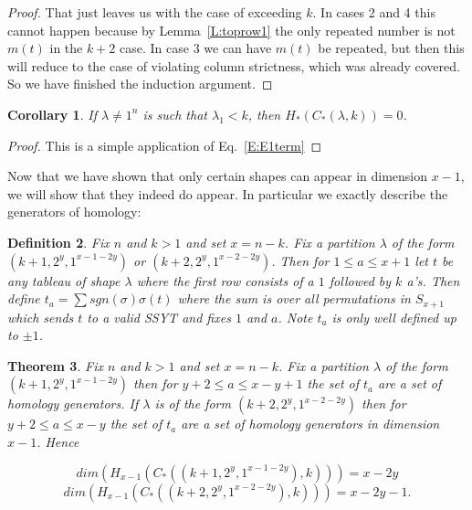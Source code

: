 \documentclass{amsart}
\newtheorem{theorem}{Theorem}[section]
\newtheorem{definition}[theorem]{Definition}
\newtheorem{corollary}[theorem]{Corollary}
\begin{document}
\begin{proof}
  That just leaves us with the case of exceeding $k$. In cases 2 and 4 this cannot happen because by Lemma~\ref{L:toprow1} 
  the only repeated number is not $m(t)$ in the $k+2$ case. In case 3 we can have $m(t)$ be repeated,
  but then this will reduce to the case of violating column strictness, which was already covered. So we have finished the induction
  argument.

\end{proof}

\begin{corollary} \label{C:firstcolumn}
  If $ \lambda \ne 1^n $ is such that $\lambda_1 < k$, then $H_*(C_*(\lambda, k))=0$.
\end{corollary}
\begin{proof}
  This is a simple application of Eq.~\ref{E:E1term}

\end{proof}

Now that we have  shown that only certain shapes can appear in dimension $x-1$, we will show that they indeed do appear.
In particular we exactly describe the generators of homology:


\begin{definition} Fix $n$ and $k > 1$ and set $x=n-k$. Fix a partition $\lambda$ of the form $(k+1, 2^y, 1^{x-1-2y})$ or 
$(k+2, 2^y, 1^{x-2-2y})$. Then for $1 \le a \le x+1$ let $t$ be any tableau of shape $\lambda$ where the first row consists of a $1$ 
followed by $k$ a's. Then define $t_a = \sum sgn ( \sigma ) \sigma (t)$ where the sum is over all permutations in $S_{x+1}$ which 
sends $t$
to a valid SSYT and fixes $1$ and $a$. Note $t_a$ is only well defined up to $\pm 1$.
\end{definition}

\begin{theorem} Fix $n$ and $k > 1$ and set $x=n-k$. Fix a partition $\lambda$ of the form $(k+1, 2^y, 1^{x-1-2y})$ then for $y+2 \le a \le
  x-y+1$ the set of $t_a$ are a set of homology generators. If $\lambda$ is of the form $(k+2, 2^y, 1^{x-2-2y})$ then for $y+2 \le a \le 
  x-y$ the set of $t_a$ are a set of homology generators in dimension $x-1$. Hence

  \begin{equation}\label{E:dim1}
    dim(H_{x-1}(C_*((k+1, 2^y, 1^{x-1-2y}),k) )) = x-2y
  \end{equation}
  \begin{equation}\label{E:dim2}
    dim(H_{x-1}( C_*((k+2, 2^y, 1^{x-2-2y}),k) )) = x-2y-1.
  \end{equation}

\end{theorem}
\end{document}
